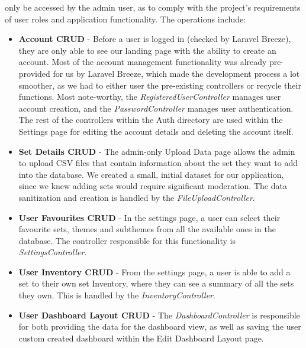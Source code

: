 only be accessed by the admin user, as to comply with the project's requirements of user roles and application functionality. The operations include:
\begin{itemize}
    \item \textbf{Account CRUD} - Before a user is logged in (checked by Laravel Breeze), they are only able to see our landing page with the ability to create an account.
    Most of the account management functionality was already pre-provided for us by Laravel Breeze, which made the development process a lot smoother,
    as we had to either user the pre-existing controllers or recycle their functions. Most note-worthy, the \textit{RegisteredUserController} manages user account creation,
    and the \textit{PasswordController} manages user authentication. The rest of the controllers within the Auth directory are used within the Settings page
    for editing the account details and deleting the account itself.
    \item \textbf{Set Details CRUD} - The admin-only Upload Data page allows the admin to upload CSV files that contain information about the set they want
    to add into the database. We created a small, initial dataset for our application, since we knew adding sets would require significant moderation. The data
    sanitization and creation is handled by the \textit{FileUploadController}.
    \item \textbf{User Favourites CRUD} - In the settings page, a user can select their favourite sets, themes and subthemes from all the available ones
    in the database. The controller responsible for this functionality is \textit{SettingsController}.
    \item \textbf{User Inventory CRUD} - From the settings page, a user is able to add a set to their own set Inventory, where they can see a summary
    of all the sets they own. This is handled by the \textit{InventoryController}.
    \item \textbf{User Dashboard Layout CRUD} - The \textit{DashboardController} is responsible for both providing the data for the dashboard view, as well
    as saving the user custom created dashboard within the Edit Dashboard Layout page.
\end{itemize}